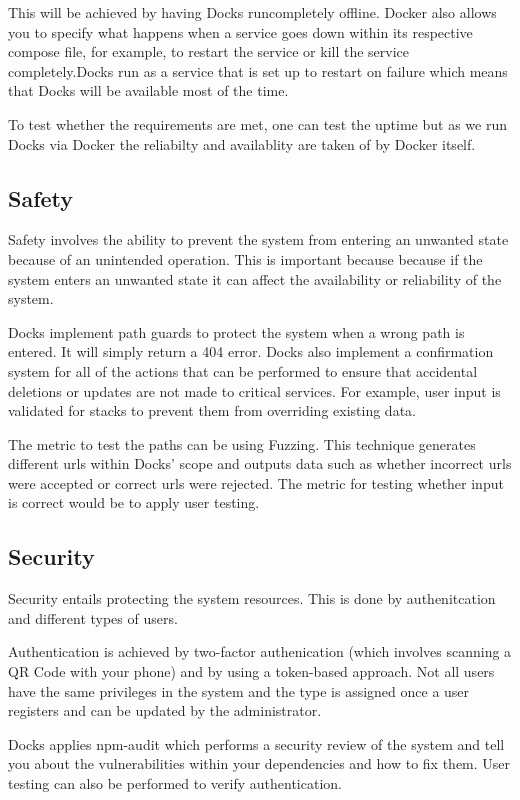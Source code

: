 \documentclass[]{article}
\begin{document}
This will be achieved by having Docks runcompletely offline. Docker also allows you to specify what happens when a service goes down within its respective compose file, for example, to restart the service or kill the service completely.Docks run as a service that is set up to restart on failure which means that Docks will be available most of the time.

To test whether the requirements are met, one can test the uptime but as we run Docks via Docker the reliabilty and availablity are taken of by Docker itself.

\subsection{Safety}
Safety involves the ability to prevent the system from entering an unwanted state because of an unintended operation. This is important because because if the system enters an unwanted state it can affect the availability or reliability of the system. 

Docks implement path guards to protect the system when a wrong path is entered. It will simply return a 404 error. Docks also implement a confirmation system for all of the actions that can be performed to ensure that accidental deletions or updates are not made to critical services. For example, user input is validated for stacks to prevent them from overriding existing data.

The metric to test the paths can be using Fuzzing. This technique generates different urls within Docks' scope and outputs data such as whether incorrect urls were accepted or correct urls were rejected. The metric for testing whether input is correct would be to apply user testing.

\subsection{Security}
Security entails protecting the system resources. This is done by authenitcation and different types of users. 

Authentication is achieved by two-factor authenication (which involves scanning a QR Code with your phone) and by using a token-based approach. Not all users have the same privileges in the system and the type is assigned once a user registers and can be updated by the administrator.

Docks applies npm-audit which performs a security review of the system and tell you about the vulnerabilities within your dependencies and how to fix them. User testing can also be performed to verify authentication.
\end{document}

